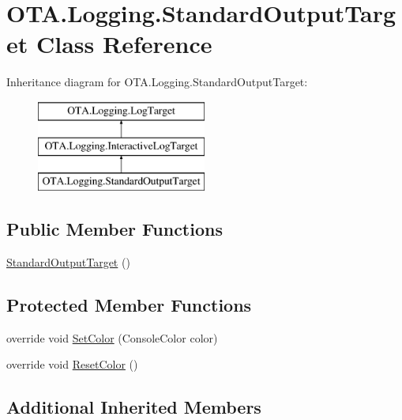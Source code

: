 \hypertarget{class_o_t_a_1_1_logging_1_1_standard_output_target}{}\section{O\+T\+A.\+Logging.\+Standard\+Output\+Target Class Reference}
\label{class_o_t_a_1_1_logging_1_1_standard_output_target}
Inheritance diagram for O\+T\+A.\+Logging.\+Standard\+Output\+Target\+:\begin{figure}[H]
\begin{center}
\leavevmode
\includegraphics[height=3.000000cm]{class_o_t_a_1_1_logging_1_1_standard_output_target}
\end{center}
\end{figure}
\subsection*{Public Member Functions}
\begin{DoxyCompactItemize}
\item 
\hyperlink{class_o_t_a_1_1_logging_1_1_standard_output_target_a83c312aee81ebf733b8ff44d1a3d1f89}{Standard\+Output\+Target} ()
\end{DoxyCompactItemize}
\subsection*{Protected Member Functions}
\begin{DoxyCompactItemize}
\item 
override void \hyperlink{class_o_t_a_1_1_logging_1_1_standard_output_target_ad26b0e52b6320bf168165a390372ee45}{Set\+Color} (Console\+Color color)
\item 
override void \hyperlink{class_o_t_a_1_1_logging_1_1_standard_output_target_a6fb3e0cf93244a840b9e17f27e1f3d96}{Reset\+Color} ()
\end{DoxyCompactItemize}
\subsection*{Additional Inherited Members}


